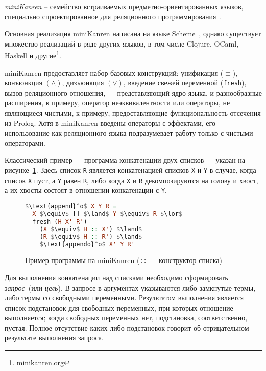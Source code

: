 {\it miniKanren} -- семейство встраиваемых предметно-ориентированных языков,
специально спроектированное для реляционного программирования~\cite{byrdMK}.

Основная реализация miniKanren написана на языке Scheme~\cite{reasonedSchemer},
однако существует множество реализаций в ряде других языков, в том числе
Clojure, OCaml, Haskell и другие\footnote{\url{minikanren.org}}.

miniKanren предоставляет набор базовых конструкций: унификация ($\equiv$),
конъюнкция $(\land)$, дизъюнкция $(\lor)$, введение свежей переменной
(\lstinline{fresh}), вызов реляционного отношения,
--- представляющий ядро языка, и разнообразные расширения, к примеру, оператор неэквивалентности
 или операторы, не являющиеся чистыми, к примеру, предоставляющие функциональность
отсечения из Prolog. Хотя в miniKanren введены операторы с эффектами,
его использование как реляционного языка подразумевает работу только с чистыми операторами.

Классический пример --- программа конкатенации двух списков --- указан
на рисунке~\ref{fig:appendo}.
Здесь список \lstinline{R} является конкатенацией списков \lstinline{X} и
\lstinline{Y} в случае, когда список \lstinline{X} пуст, а \lstinline{Y}
равен \lstinline{R}, либо когда \lstinline{X} и \lstinline{R} декомпозируются
на голову и хвост, а их хвосты состоят в отношении конкатенации с \lstinline{Y}.

\begin{figure}[h!]
\begin{lstlisting}[mathescape,language=Haskell,extendedchars=\true,frame=single,basicstyle=\ttfamily]
$\text{append}^o$ X Y R =
  X $\equiv$ [] $\land$ Y $\equiv$ R $\lor$
  fresh (H X' R')
    (X $\equiv$ H :: X') $\land$
    (R $\equiv$ H :: R') $\land$
    $\text{appendo}^o$ X' Y R'
\end{lstlisting}

\caption{Пример программы на miniKanren (\lstinline{::} --- конструктор списка)}
\label{fig:appendo}
\end{figure}

Для выполнения конкатенации над списками необходимо сформировать
\emph{запрос}~(или \emph{цель}).
В запросе в аргументах указываются либо замкнутые термы, либо термы
со свободными переменными. Результатом выполнения является список
подстановок для свободных переменных, при которых отношение выполняется;
когда свободных переменных нет, подстановка, соответственно, пустая.
Полное отсутствие каких-либо подстановок говорит об отрицательном результате
выполнения запроса.

